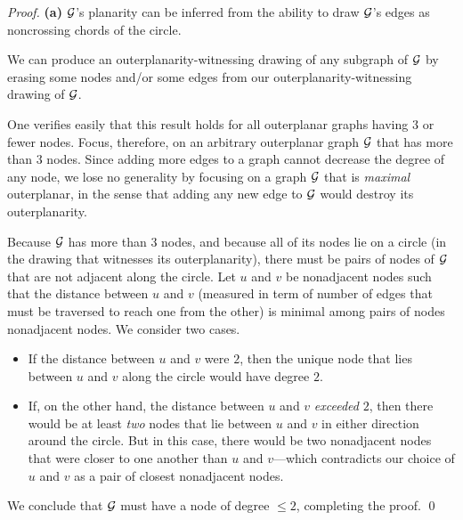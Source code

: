 \begin{proof}
{\bf (a)} $\mbox{$\cal G$}$'s planarity can be inferred from the ability to draw
$\mbox{$\cal G$}$'s edges as noncrossing chords of the circle.

\medskip
{}

 We can produce an outerplanarity-witnessing
drawing of any subgraph of $\mbox{$\cal G$}$ by erasing some nodes and/or some
edges from our outerplanarity-witnessing drawing of $\mbox{$\cal G$}$.

\medskip

 One verifies easily that this result holds for all
outerplanar graphs having $3$ or fewer nodes.  Focus, therefore, on an
arbitrary outerplanar graph $\mbox{$\cal G$}$ that has more than $3$ nodes.  Since
adding more edges to a graph cannot decrease the degree of any node,
we lose no generality by focusing on a graph $\mbox{$\cal G$}$ that is {\em maximal}
outerplanar,  in the sense that
adding any new edge to $\mbox{$\cal G$}$ would destroy its outerplanarity.

Because $\mbox{$\cal G$}$ has more than $3$ nodes, and because all of its nodes lie
on a circle (in the drawing that witnesses its outerplanarity), there
must be pairs of nodes of $\mbox{$\cal G$}$ that are not adjacent along the circle.
Let $u$ and $v$ be nonadjacent nodes such that the distance between
$u$ and $v$ (measured in term of number of edges that must be traversed to reach one
from the other) is minimal among pairs of nodes nonadjacent nodes.  We
consider two cases.
\begin{itemize}
\item
If the distance between $u$ and $v$ were $2$, then the unique node
that lies between $u$ and $v$ along the circle would have degree $2$.
\item
If, on the other hand, the distance between $u$ and $v$ {\em exceeded}
$2$, then there would be at least {\em two} nodes that lie between $u$
and $v$ in either direction around the circle.  But in this case,
there would be two nonadjacent nodes that were closer to one another
than $u$ and $v$---which contradicts our choice of $u$ and $v$ as a
pair of closest nonadjacent nodes.
\end{itemize}
We conclude that $\mbox{$\cal G$}$ must have a node of degree $\leq 2$, completing
the proof.
\qed
\end{proof}

